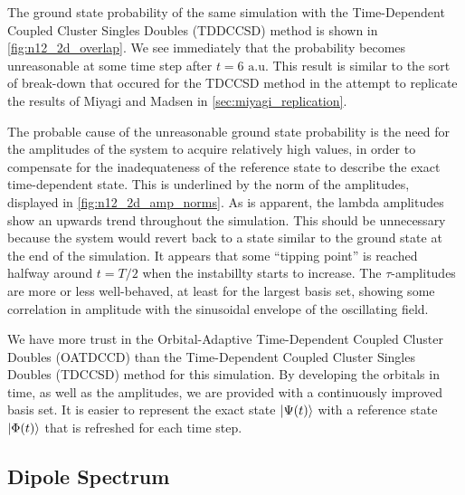 The ground state probability of the same simulation with the 
Time-Dependent Coupled Cluster Singles Doubles (TDDCCSD) method 
is shown in
\autoref{fig:n12_2d_overlap}. We see immediately that the probability becomes 
unreasonable at some time step after $t=6 \text{ a.u.}$ This result is similar to
the sort of break-down that occured for the TDCCSD method in the attempt to 
replicate the results of Miyagi and Madsen \cite{miyagi2013time} in
\autoref{sec:miyagi_replication}.

The probable cause of the unreasonable 
ground state probability is the need for the amplitudes of the system to acquire 
relatively high values, in order to compensate for the inadequateness of the 
reference state to describe the exact time-dependent state. This is underlined 
by the norm of the amplitudes, displayed in \autoref{fig:n12_2d_amp_norms}. As 
is apparent, the lambda amplitudes show an upwards trend throughout the 
simulation.
This should be unnecessary because the system would revert back to a state 
similar to the ground state at the end of the simulation. It appears that 
some ``tipping point'' is reached halfway around $t=T/2$ when the instabillty 
starts to increase. The $\tau$-amplitudes are more or less well-behaved, at least for 
the largest basis set, showing some correlation in amplitude with the
sinusoidal envelope of the oscillating field.

We have more trust in the Orbital-Adaptive Time-Dependent Coupled Cluster 
Doubles (OATDCCD) than the Time-Dependent Coupled Cluster Singles Doubles (TDCCSD)
method for this simulation. By developing the orbitals in time, as well as the 
amplitudes, we are provided with a continuously improved basis set. It is easier
to represent the exact state $\ket{\Psi(t)}$ with a reference state $\ket{\Phi(t)}$
that is refreshed for each time step.

\subsection{Dipole Spectrum}

